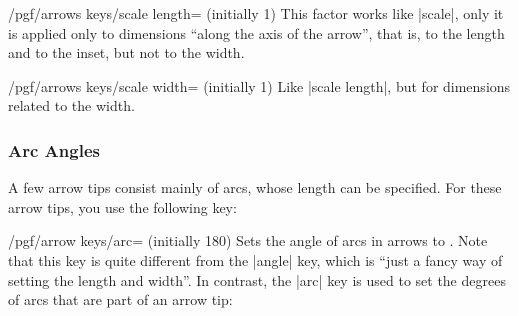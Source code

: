 \begin{key}{/pgf/arrows keys/scale length= (initially 1)}
    This factor works like |scale|, only it is applied only to dimensions
    ``along the axis of the arrow'', that is, to the length and to the inset,
    but not to the width.
\begin{codeexample}[preamble={\usetikzlibrary{arrows.meta}}]
\end{codeexample}
\end{key}

\begin{key}{/pgf/arrows keys/scale width= (initially 1)}
    Like |scale length|, but for dimensions related to the width.
\begin{codeexample}[preamble={\usetikzlibrary{arrows.meta}}]
\end{codeexample}
\end{key}


\subsubsection{Arc Angles}

A few arrow tips consist mainly of arcs, whose length can be specified. For
these arrow tips, you use the following key:

\begin{key}{/pgf/arrow keys/arc= (initially 180)}
    Sets the angle of arcs in arrows to . Note that this key is
    quite different from the |angle| key, which is ``just a fancy way of
    setting the length and width''. In contrast, the |arc| key is used to set
    the degrees of arcs that are part of an arrow tip:
\begin{codeexample}[preamble={\usetikzlibrary{arrows.meta}}]
\end{codeexample}
\end{key}


